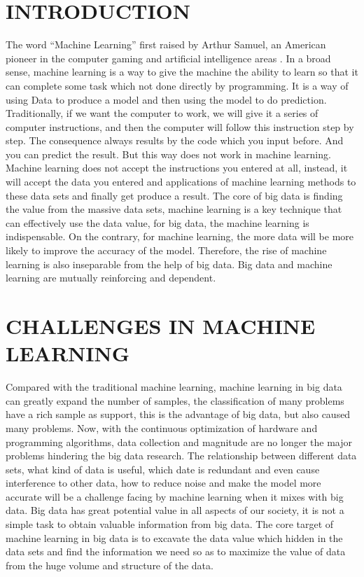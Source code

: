 \documentclass[sigconf]{acmart}
\begin{document}
\section{INTRODUCTION}
The word ``Machine Learning'' first raised by Arthur Samuel, an American pioneer in the computer gaming and artificial intelligence areas \cite{Kohavi1}. In a broad sense, machine learning is a way to give the machine the ability to learn so that it can complete some task which not done directly by programming. It is a way of using Data to produce a model and then using the model to do prediction. Traditionally, if we want the computer to work, we will give it a series of computer instructions, and then the computer will follow this instruction step by step. The consequence always results by the code which you input before. And you can predict the result. But this way does not work in machine learning. Machine learning does not accept the instructions you entered at all, instead, it will accept the data you entered and applications of machine learning methods to these data sets and finally get produce a result. The core of big data is finding the value from the massive data sets, machine learning is a key technique that can effectively use the data value, for big data, the machine learning is indispensable. On the contrary, for machine learning, the more data will be more likely to improve the accuracy of the model. Therefore, the rise of machine learning is also inseparable from the help of big data. Big data and machine learning are mutually reinforcing and dependent.

\section{CHALLENGES IN MACHINE LEARNING}
Compared with the traditional machine learning, machine learning in big data can greatly expand the number of samples, the classification of many problems have a rich sample as support, this is the advantage of big data, but also caused many problems. Now, with the continuous optimization of hardware and programming algorithms, data collection and magnitude are no longer the major problems hindering the big data research. The relationship between different data sets, what kind of data is useful, which date is redundant and even cause interference to other data, how to reduce noise and make the model more accurate will be a challenge facing by machine learning when it mixes with big data. Big data has great potential value in all aspects of our society, it is not a simple task to obtain valuable information from big data. The core target of machine learning in big data is to excavate the data value which hidden in the data sets and find the information we need so as to maximize the value of data from the huge volume and structure of the data.
\end{document}

